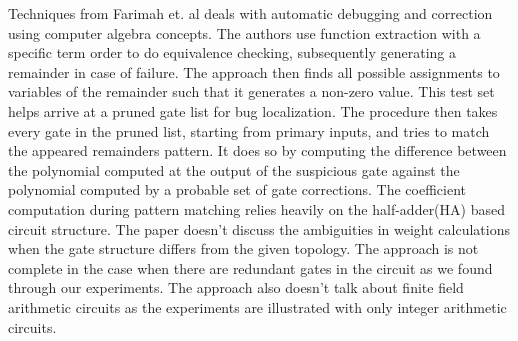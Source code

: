 Techniques from Farimah et. al \cite{farimah:2016} deals with automatic debugging and correction using computer algebra concepts. The authors use function extraction\cite{maciej:2015:1} with a specific term order\cite{lv} to do equivalence checking, subsequently generating a remainder in case of failure. The approach then finds all possible assignments to variables of the remainder such that it generates a non-zero value. This test set helps arrive at a pruned gate list for bug localization. The procedure then takes every gate in the pruned list, starting from primary inputs, and tries to match the appeared remainders pattern. It does so by computing the difference between the polynomial computed at the output of the suspicious gate against the polynomial computed by a probable set of gate corrections. The coefficient computation\cite{maciej:2015:2} during pattern matching relies heavily on the half-adder(HA) based circuit structure. The paper doesn't discuss the ambiguities in weight calculations when the gate structure differs from the given topology. The approach is not complete in the case when there are redundant gates in the circuit as we found through our experiments. The approach also doesn't talk about finite field arithmetic circuits as the experiments are illustrated with only integer arithmetic circuits.




